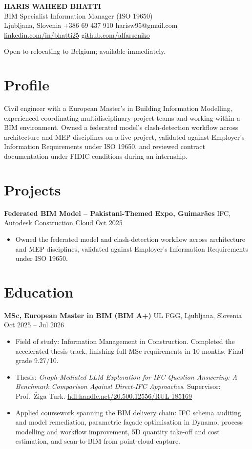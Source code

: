 \documentclass[a4paper,10.5pt]{article}
\newcommand{\datefill}{\dotfill}
\newcommand{\entry}[3]{\vspace{2.5pt}\noindent\textbf{#1} \textbar{} #2 \datefill{} #3\par\vspace{0.5pt}}
\newcommand{\ROLELINE}{BIM Specialist \textbar{} Information Manager (ISO 19650)}
\newcommand{\projGuimaraes}{%
\entry{Federated BIM Model -- Pakistani-Themed Expo, Guimar\~aes}{IFC, Autodesk Construction Cloud}{Oct 2025}
\begin{itemize}
  \item Owned the federated model and clash-detection workflow across architecture
        and MEP disciplines, validated against Employer's Information Requirements
        under ISO 19650.
\end{itemize}}
\begin{document}
\begin{center}
  {\LARGE\bfseries HARIS WAHEED BHATTI}\\[2pt]
  {\large \ROLELINE}\\[3pt]
  Ljubljana, Slovenia \textbar{} +386 69 437 910 \textbar{} harisw95@gmail.com\\
  \href{https://linkedin.com/in/bhatti25}{linkedin.com/in/bhatti25} \textbar{}
  \href{https://github.com/alfarseniko}{github.com/alfarseniko}
\end{center}
\vspace{-4pt}
\noindent\small Open to relocating to Belgium; available immediately.\normalsize

\section{Profile}

\noindent Civil engineer with a European Master's in Building Information Modelling,
experienced coordinating multidisciplinary project teams and working within a BIM
environment. Owned a federated model's clash-detection workflow across architecture
and MEP disciplines on a live project, validated against Employer's Information
Requirements under ISO 19650, and reviewed contract documentation under FIDIC
conditions during an internship.

\section{Projects}

 \projGuimaraes

\section{Education}
\entry{MSc, European Master in BIM (BIM A+)}{UL FGG, Ljubljana, Slovenia}{Oct 2025 -- Jul 2026}
\begin{itemize}
  \item Field of study: Information Management in Construction. Completed the
        accelerated thesis track, finishing full MSc requirements in 10 months.
        Final grade 9.27/10.
  \item Thesis: \textit{Graph-Mediated LLM Exploration for IFC Question Answering:
        A Benchmark Comparison Against Direct-IFC Approaches}. Supervisor:
        Prof.~\v{Z}iga Turk. \href{http://hdl.handle.net/20.500.12556/RUL-185169}{hdl.handle.net/20.500.12556/RUL-185169}
  \item Applied coursework spanning the BIM delivery chain: IFC schema auditing and model remediation, parametric façade optimisation in Dynamo, process modelling and workflow improvement, 5D quantity take-off and cost estimation, and scan-to-BIM from point-cloud capture.
\end{itemize}
\end{document}
